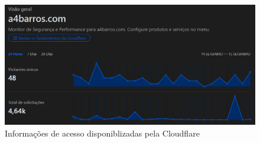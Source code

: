 \begin{figure}[ht]
    \begin{center}
    \includegraphics[width=400pt]{img/cloudflare-stat.png}
    \caption{Informações de acesso disponiblizadas pela Cloudflare}
    \label{fig:cloudflare-stat.png}
    \end{center}
\end{figure}